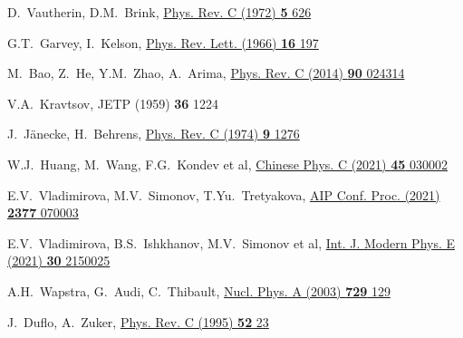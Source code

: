 \begin{thebibliography}{9}
D.~Vautherin, D.M.~Brink,
\href{https://doi.org/10.1103/PhysRevC.5.626}
  {Phys. Rev. C (1972) \textbf{5} 626}

G.T.~Garvey, I.~Kelson,
\href{https://doi.org/10.1103/PhysRevLett.16.197}
  {Phys. Rev. Lett. (1966) \textbf{16} 197}

M.~Bao, Z.~He, Y.M.~Zhao, A.~Arima,
\href{https://doi.org/10.1103/PhysRevC.90.024314}
  {Phys. Rev. C (2014) \textbf{90} 024314}

V.A.~Kravtsov,
JETP (1959) \textbf{36} 1224

J.~J{\"a}necke, H.~Behrens,
\href{https://doi.org/10.1103/PhysRevC.9.1276}
  {Phys. Rev. C (1974) \textbf{9} 1276}

W.J.~Huang, M.~Wang, F.G.~Kondev et al,
\href{https://doi.org/10.1088/1674-1137/abddb0}
  {Chinese Phys. C (2021) \textbf{45} 030002}

E.V.~Vladimirova, M.V.~Simonov, T.Yu.~Tretyakova,
\href{https://doi.org/10.1063/5.0063340}
  {AIP Conf. Proc. (2021) \textbf{2377} 070003}

E.V.~Vladimirova, B.S.~Ishkhanov, M.V.~Simonov et al,
\href{https://doi.org/10.1142/S0218301321500257}
  {Int. J. Modern Phys. E (2021) \textbf{30} 2150025}


A.H.~Wapstra, G.~Audi, C.~Thibault,
\href{https://doi.org/10.1016/j.nuclphysa.2003.11.002}
  {Nucl. Phys. A (2003) \textbf{729} 129}

J.~Duflo, A.~Zuker,
\href{https://doi.org/10.1103/PhysRevC.52.R23}
  {Phys. Rev. C (1995) \textbf{52} 23}


\end{thebibliography}
